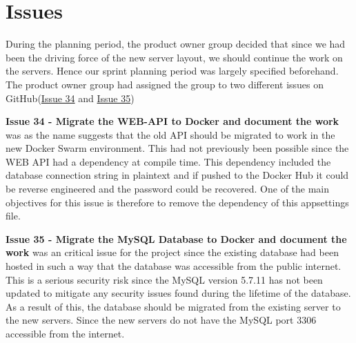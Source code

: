 \section{Issues}\label{SEC:Sprint3Issues}
During the planning period, the product owner group decided that since we had been the driving force of the new server layout, we should continue the work on the servers.
Hence our sprint planning period was largely specified beforehand.
The product owner group had assigned the group to two different issues on GitHub(\href{https://github.com/aau-giraf/wiki/issues/34}{Issue 34} and \href{https://github.com/aau-giraf/wiki/issues/35}{Issue 35})

\textbf{Issue 34 - Migrate the WEB-API to Docker and document the work} was as the name suggests that the old API should be migrated to work in the new Docker Swarm environment.
This had not previously been possible since the WEB API had a dependency at compile time.
This dependency included the database connection string in plaintext and if pushed to the Docker Hub it could be reverse engineered and the password could be recovered.
One of the main objectives for this issue is therefore to remove the dependency of this appsettings file.

\textbf{Issue 35 - Migrate the MySQL Database to Docker and document the work} was an critical issue for the project since the existing database had been hosted in such a way that the database was accessible from the public internet.
This is a serious security risk since the MySQL version 5.7.11 has not been updated to mitigate any security issues found during the lifetime of the database.
As a result of this, the database should be migrated from the existing server to the new servers.
Since the new servers do not have the MySQL port $3306$ accessible from the internet.
